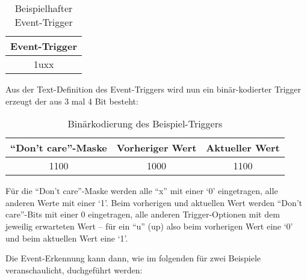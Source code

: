 {\begin{table}[H]
\centering
\begin{tabular}{|c|}
\hline
\rowcolor[HTML]{C0C0C0} 
Event-Trigger \\ \hline
1uxx          \\ \hline
\end{tabular}
\caption{Beispielhafter Event-Trigger}
\label{my-label}
\end{table}


Aus der Text-Definition des Event-Triggers wird nun ein binär-kodierter Trigger erzeugt der aus 3 mal 4 Bit besteht:  
\begin{table}[H]
\centering
\begin{tabular}{|l|l|l|}
\hline
\rowcolor[HTML]{C0C0C0} 
``Don't care''-Maske         & Vorheriger Wert           & Aktueller Wert            \\ \hline
\multicolumn{1}{|c|}{1100} & \multicolumn{1}{c|}{1000} & \multicolumn{1}{c|}{1100} \\ \hline
\end{tabular}
\caption{Binärkodierung des Beispiel-Triggers}
\label{my-label}
\end{table}
 
Für die ``Don't care''-Maske werden alle ``x'' mit einer `0' eingetragen, alle anderen Werte mit einer `1'. Beim vorherigen und aktuellen Wert werden ``Don't care''-Bits mit einer 0 eingetragen, alle anderen Trigger-Optionen mit dem jeweilig erwarteten Wert -- für ein ``u'' (up) also beim vorherigen Wert eine `0' und beim aktuellen Wert eine `1'.

Die Event-Erkennung kann dann, wie im folgenden für zwei Beispiele veranschaulicht, duchgeführt werden:

}
